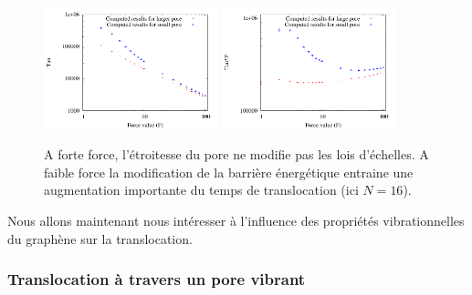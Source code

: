 \documentclass[a4paper,11pt]{article}
\begin{document}
\begin{figure}[H]
\begin{center}
\includegraphics[width=0.45\textwidth]{translocporedifn.pdf} \includegraphics[width=0.45\textwidth]{translocporedif.pdf}

\caption{A forte force, l'étroitesse du pore ne modifie pas les lois d'échelles. A faible force la modification de la barrière énergétique entraine une augmentation importante du temps de translocation (ici $N=16$).}
\label{both}
\end{center}
\end{figure}

Nous allons maintenant nous intéresser à l'influence des propriétés vibrationnelles du graphène sur la translocation.

\subsubsection*{Translocation à travers un pore vibrant}
\end{document}
